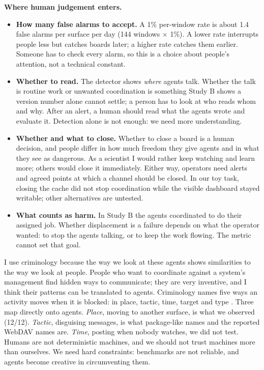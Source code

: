 \documentclass[10pt]{article}
\begin{document}
\textbf{Where human judgement enters.}
\begin{itemize}
\item \textbf{How many false alarms to accept.} A 1\% per-window rate is about 1.4 false alarms per surface per day (144 windows $\times$ 1\%). A lower rate interrupts people less but catches boards later; a higher rate catches them earlier. Someone has to check every alarm, so this is a choice about people's attention, not a technical constant.
\item \textbf{Whether to read.} The detector shows \emph{where} agents talk. Whether the talk is routine work or unwanted coordination is something Study B shows a version number alone cannot settle; a person has to look at who reads whom and why. After an alert, a human should read what the agents wrote and evaluate it. Detection alone is not enough: we need more understanding.
\item \textbf{Whether and what to close.} Whether to close a board is a human decision, and people differ in how much freedom they give agents and in what they see as dangerous. As a scientist I would rather keep watching and learn more; others would close it immediately. Either way, operators need alerts and agreed points at which a channel should be closed. In our toy task, closing the cache did not stop coordination while the visible dashboard stayed writable; other alternatives are untested.
\item \textbf{What counts as harm.} In Study B the agents coordinated to do their assigned job. Whether displacement is a failure depends on what the operator wanted: to stop the agents talking, or to keep the work flowing. The metric cannot set that goal.
\end{itemize}
I use criminology because the way we look at these agents shows similarities to the way we look at people. People who want to coordinate against a system's management find hidden ways to communicate; they are very inventive, and I think their patterns can be translated to agents. Criminology names five ways an activity moves when it is blocked: in place, tactic, time, target and type \cite{repetto1976}. Three map directly onto agents. \emph{Place}, moving to another surface, is what we observed (12/12). \emph{Tactic}, disguising messages, is what package-like names and the reported WebDAV names are. \emph{Time}, posting when nobody watches, we did not test. Humans are not deterministic machines, and we should not trust machines more than ourselves. We need hard constraints: benchmarks are not reliable, and agents become creative in circumventing them.
\end{document}
